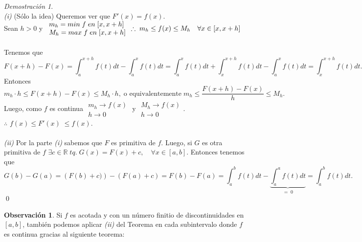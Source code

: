 \documentclass{article}
\theoremstyle{definition}
\newtheorem*{obs}{Observación}
\theoremstyle{remark}
\newtheorem*{demo}{Demostración}
\newcommand\R{\ensuremath{\mathbb{R}}}
\begin{document}
\begin{demo} \; \\
  \emph{(i)} (Sólo la idea) Queremos ver que $F'(x)=f(x).$ \\
  Sean $h>0$ y $
  \begin{array}{l}
m_h = min \; f \; en \;  [x,x+h] \\
M_h = max \; f \; en \;  [x,x+h]
    \end{array} \quad \\\\ \therefore \; m_h \leq f(x) \leq M_h \quad \forall x \in [x,x+h]$\\ \\
Tenemos que \\
\[
F(x+h)-F(x)=\int_{a}^{x+h}{f(t)dt} - \int_{a}^{x}{f(t)dt} = \int_{a}^{x}{f(t)dt}+\int_{x}^{x+h}{f(t)dt}-\int_{a}^{x}{f(t)dt}=\int_{x}^{x+h}{f(t)dt.}
\]
Entonces
\[
m_h\cdot h \leq F(x+h) -F(x) \leq M_h\cdot h, \; \text{o equivalentemente} \; m_h \leq \frac{F(x+h)-F(x)}{h} \leq M_h.
\]
Luego, como $f$ es continua $\begin{array}{c}
m_h \to f(x) \\
h \to 0\phantom{x}
\end{array}$ y $\begin{array}{c}
  M_h \to f(x) \\
  h \to 0\phantom{x}
\end{array}$.\\
 $\therefore$ $f(x) \leq F'(x)\; \leq f(x)$.
\\
\\
\emph{(ii)} Por la parte \emph{(i)} sabemos que $F$ es primitiva de $f$. Luego, si $G$ es otra primitiva de $f$ $\exists c \in \R \; tq. \; G(x)=F(x)+c, \quad \forall x \in [a,b]$.  Entonces tenemos que \[
G(b)-G(a)=\left(F(b)+c)\right) - \left( F(a)+c \right) = F(b)-F(a)=\int_{a}^{b}{f(t)dt}-\underbrace{\int_{a}^{a}{f(t)dt}}_{=\;0}=\int_{a}^{b}{f(t)dt}.
\] \qed
\end{demo}
\begin{obs}
  Si $f$ es acotada y con un número finitio de discontinuidades en $[a,b]$, también podemos aplicar \emph{(ii)} del Teorema en cada subintervalo donde $f$ es continua gracias al siguiente teorema:
\end{obs}
\end{document}

